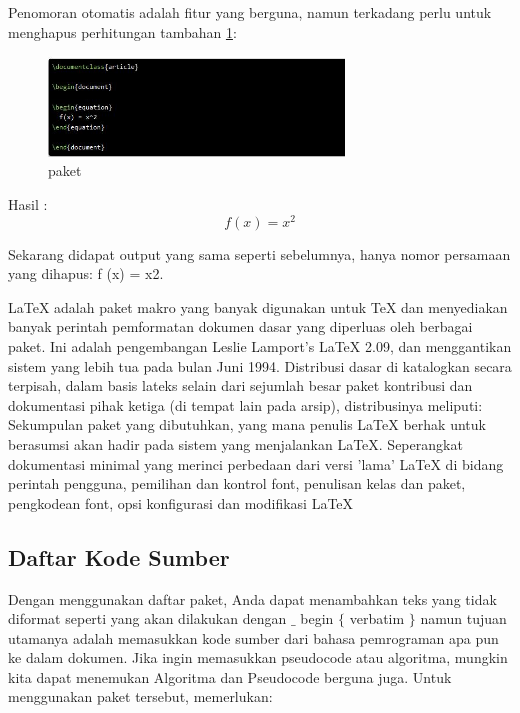 \vspace{12pt}
\hspace{0.50in} Penomoran otomatis adalah fitur yang berguna, namun terkadang perlu untuk menghapus perhitungan tambahan \ref{paket}:
\begin{figure}[ht]
	\centerline{\includegraphics[width=0.70\textwidth]{gambar/paket}}
	\caption{paket}
	\label{paket}
\end{figure}

\hspace{0.50in}Hasil :
\begin{equation}
f(x) = x^2
\end{equation}

\vspace{12pt}
\hspace{0.50in} Sekarang didapat output yang sama seperti sebelumnya, hanya nomor persamaan yang dihapus: f (x) = x2.\par
\hspace{0.50in} LaTeX adalah paket makro yang banyak digunakan untuk TeX dan menyediakan banyak perintah pemformatan dokumen dasar yang diperluas oleh berbagai paket. Ini adalah pengembangan Leslie Lamport's LaTeX 2.09, dan menggantikan sistem yang lebih tua pada bulan Juni 1994. Distribusi dasar di katalogkan secara terpisah, dalam basis lateks selain dari sejumlah besar paket kontribusi dan dokumentasi pihak ketiga (di tempat lain pada arsip), distribusinya meliputi: Sekumpulan paket yang dibutuhkan, yang mana penulis LaTeX berhak untuk berasumsi akan hadir pada sistem yang menjalankan LaTeX. Seperangkat dokumentasi minimal yang merinci perbedaan dari versi 'lama' LaTeX di bidang perintah pengguna, pemilihan dan kontrol font, penulisan kelas dan paket, pengkodean font, opsi konfigurasi dan modifikasi LaTeX \par

\subsection{Daftar Kode Sumber}\par
\hspace{0.50in} Dengan menggunakan daftar paket, Anda dapat menambahkan teks yang tidak diformat seperti yang akan dilakukan dengan  $ \_ $  begin  $ \{ $ verbatim $ \} $  namun tujuan utamanya adalah memasukkan kode sumber dari bahasa pemrograman apa pun ke dalam dokumen. Jika ingin memasukkan pseudocode atau algoritma, mungkin kita dapat menemukan Algoritma dan Pseudocode berguna juga. Untuk menggunakan paket tersebut, memerlukan: 

